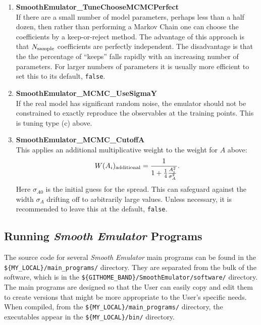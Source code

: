 \documentclass[UserManual.tex]{subfiles}
\begin{document}
\begin{enumerate}
\item {\bf SmoothEmulator\_TuneChooseMCMCPerfect}\\
If there are a small number of model parameters, perhaps less than a half dozen, then rather than performing a Markov Chain one can choose the coefficients by a keep-or-reject method. The advantage of this approach is that $N_{\rm sample}$ coefficients are perfectly independent. The disadvantage is that the the percentage of ``keeps'' falls rapidly with an increasing number of parameters. For larger numbers of parameters it is usually more efficient to set this to its default, {\tt false}. 

\item {\bf SmoothEmulator\_MCMC\_UseSigmaY}\\
If the real model has significant random noise, the emulator should not be constrained to exactly reproduce the observables at the training points. This is tuning type (c) above. 

\item {\bf SmoothEmulator\_MCMC\_CutoffA}\\
This applies an additional multiplicative weight to the weight for $A$ above:
\[
W(A_i)_{\rm additional}=\frac{1}{1+\frac{1}{4}\frac{A_i^2}{\sigma_{A}^2}}.
\] 
Here $\sigma_{A0}$ is the initial guess for the spread. This can safeguard against the width $\sigma_A$ drifting off to arbitrarily large values. Unless necessary, it is recommended to leave this at the default, {\tt false}.

\end{enumerate}

\subsection{Running {\it Smooth Emulator} Programs}

The source code for several {\it Smooth Emulator} main programs can be found in the {\tt \$\{MY\_LOCAL\}/main\_programs/} directory. They are separated from the bulk of the software, which is in the {\tt \$\{GITHOME\_BAND\}/SmoothEmulator/software/} directory. The main programs are designed so that the User can easily copy and edit them to create versions that might be more appropriate to the User's specific needs. When compiled, from the {\tt \$\{MY\_LOCAL\}/main\_programs/} directory, the executables appear in the {\tt \$\{MY\_LOCAL\}/bin/} directory. 
\end{document}
